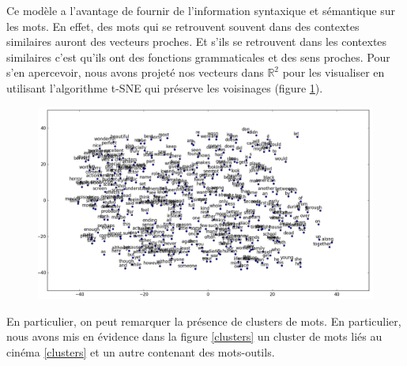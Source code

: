 \documentclass{article}
\begin{document}
Ce modèle a l'avantage de fournir de l'information syntaxique et sémantique sur les mots. En effet, des mots qui se retrouvent souvent dans des contextes similaires auront des vecteurs proches. Et s'ils se retrouvent dans les contextes similaires c'est qu'ils ont des fonctions grammaticales et des sens proches. Pour s'en apercevoir, nous avons projeté nos vecteurs dans $\mathbb{R}^{2}$ pour les visualiser en utilisant l'algorithme t-SNE \cite{van2008visualizing} qui préserve les voisinages (figure \ref{tsne_plot}).

\begin{figure}[h]
\begin{center}
\includegraphics[scale=0.35]{images/tsne_plot.png}
\label{tsne_plot}
\end{center}
\end{figure}

En particulier, on peut remarquer la présence de clusters de mots. En particulier, nous avons mis en évidence dans la figure \ref{clusters} un cluster de mots liés au cinéma \ref{clusters} et un autre contenant des mots-outils.
\end{document}
